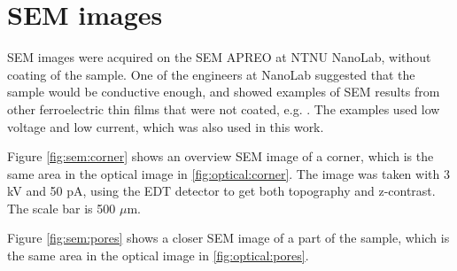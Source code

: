




\section{SEM images}
\label{results:SEM}

SEM images were acquired on the SEM APREO at NTNU NanoLab, without coating of the sample.
One of the engineers at NanoLab suggested that the sample would be conductive enough, and showed examples of SEM results from other ferroelectric thin films that were not coated, e.g. \cite{hunnestad_visualizing_2019}.
The examples used low voltage and low current, which was also used in this work.


Figure \cref{fig:sem:corner} shows an overview SEM image of a corner, which is the same area in the optical image in \cref{fig:optical:corner}.
The image was taken with 3 kV and 50 pA, using the EDT detector to get both topography and z-contrast.
The scale bar is 500 $\mu$m.


Figure \cref{fig:sem:pores} shows a closer SEM image of a part of the sample, which is the same area in the optical image in \cref{fig:optical:pores}.


